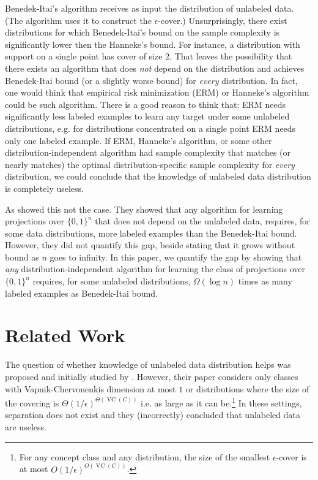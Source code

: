 \documentclass[10pt]{article}
\DeclareMathOperator{\VC}{VC}
\begin{document}
Benedek-Itai's algorithm receives as input the distribution of unlabeled data.
(The algorithm uses it to construct the $\epsilon$-cover.) Unsurprisingly, there
exist distributions for which Benedek-Itai's bound on the sample complexity is
significantly lower then the Hanneke's bound. For instance, a distribution with
support on a single point has cover of size $2$. That leaves the possibility
that there exists an algorithm that does \emph{not} depend on the distribution
and achieves Benedek-Itai bound (or a slightly worse bound) for \emph{every}
distribution. In fact, one would think that empirical risk minimization (ERM) or
Hanneke's algorithm could be such algorithm. There is a good reason to think that:
ERM needs significantly less labeled examples to learn any target under some
unlabeled distributions, e.g. for distributions concentrated on a single point
ERM needs only one labeled example. If ERM, Hanneke's algorithm, or some other
distribution-independent algorithm had sample complexity that matches (or nearly
matches) the optimal distribution-specific sample complexity for \emph{every}
distribution, we could conclude that the knowledge of unlabeled data
distribution is completely useless.

As \cite{Darnstadt-Simon-Szorenyi-2013} showed this not the case. They showed
that any algorithm for learning projections over $\{0,1\}^n$ that does not
depend on the unlabeled data, requires, for some data distributions, more
labeled examples than the Benedek-Itai bound. However, they did not quantify
this gap, beside stating that it grows without bound as $n$ goes to infinity.
In this paper, we quantify the gap by showing that \emph{any}
distribution-independent algorithm for learning the class of projections over
$\{0,1\}^n$ requires, for some unlabeled distributions, $\Omega(\log
n)$ times as many labeled examples as Benedek-Itai bound.

\section{Related Work}

The question of whether knowledge of unlabeled data distribution helps was
proposed and initially studied by \cite{Ben-David-Lu-Pal-2008}. However, their
paper considers only classes with Vapnik-Chervonenkis dimension at most $1$
or distributions where the size of the covering is
$\Theta(1/\epsilon)^{\Theta(\VC(C))}$ i.e. as large as it can be.\footnote{For
any concept class and any distribution, the size of the smallest
$\epsilon$-cover is at most $O(1/\epsilon)^{O(\VC(C))}$.} In these settings,
separation does not exist and they (incorrectly) concluded that unlabeled data
are useless.
\end{document}
